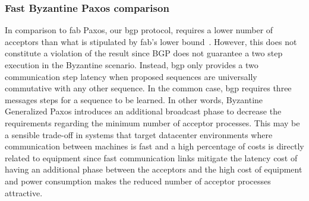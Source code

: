 \subsubsection{Fast Byzantine Paxos comparison}
In comparison to \acrshort{fab} Paxos, our \acrlong{bgp} protocol, requires a lower number of acceptors than what is stipulated by \acrshort{fab}'s lower bound~\cite{Martin2006}. However, this does not constitute a violation of the result since BGP does not guarantee a two step execution in the Byzantine scenario. Instead, \acrshort{bgp} only provides a two communication step latency when proposed sequences are universally commutative with any other sequence. In the common case, \acrshort{bgp} requires three messages steps for a sequence to be learned. In other words, Byzantine Generalized Paxos introduces an additional broadcast phase to decrease the requirements regarding the minimum number of acceptor processes. This may be a sensible trade-off in systems that target datacenter environments where communication between machines is fast and a high percentage of costs is directly related to equipment since fast communication links mitigate the latency cost of having an additional phase between the acceptors and the high cost of equipment and power consumption makes the reduced number of acceptor processes attractive.
